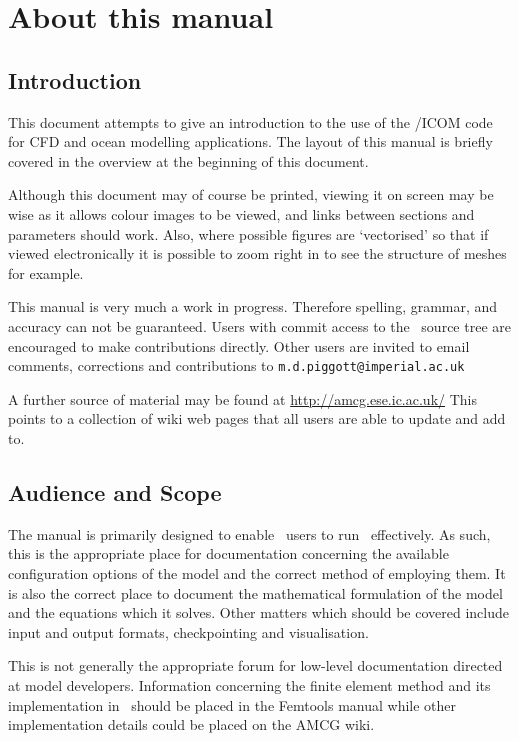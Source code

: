 \chapter{About this manual}\label{App:about}

\section{Introduction}

This document attempts to give an introduction to the use of the
\fluidity/ICOM code for CFD and ocean modelling applications.  The layout of this manual
is briefly covered in the overview at the beginning of this document.

Although this document may of course be printed, viewing it on screen may be
wise as it allows colour images to be viewed, and links between sections and
parameters should work. Also, where possible figures are `vectorised' so
that if viewed electronically it is possible to zoom right in to see the
structure of meshes for example.

This manual is very much a work in progress. Therefore spelling, grammar,
and accuracy can not be guaranteed. Users with commit access to the \fluidity\
source tree are encouraged to make contributions directly. Other users are
invited to email comments, corrections and contributions to
\verb|m.d.piggott@imperial.ac.uk|

A further source of material may be found at \url{http://amcg.ese.ic.ac.uk/}
This points to a collection of wiki web pages that all users are able to
update and add to. 

\section{Audience and Scope}

The manual is primarily designed to enable \fluidity\ users to run \fluidity\
effectively. As such, this is the appropriate place for documentation
concerning the available configuration options of the model and the correct
method of employing them. It is also the correct place to document the
mathematical formulation of the model and the equations which it
solves. Other matters which should be covered include input and output
formats, checkpointing and visualisation.

This is not generally the appropriate forum for low-level documentation
directed at model developers. Information concerning the finite element
method and its implementation in \fluidity\ should be placed in the Femtools
manual while other implementation details could be placed on the AMCG wiki.

